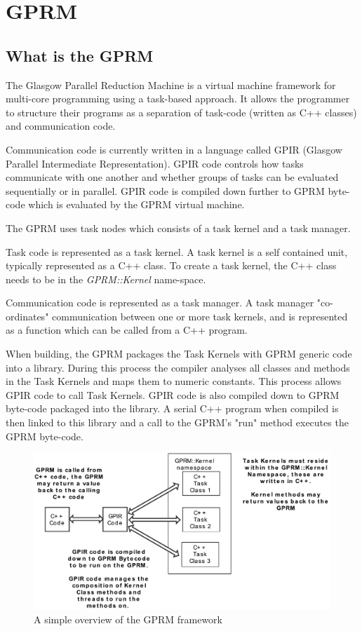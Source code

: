 \section{GPRM}

\subsection{What is the GPRM}

The Glasgow Parallel Reduction Machine\cite{GPRM} is a virtual machine framework for multi-core programming using a task-based approach. It allows the programmer to structure their programs as a separation of task-code (written as C++ classes) and communication code. 

Communication code is currently written in a language called GPIR (Glasgow Parallel Intermediate Representation). 
GPIR code controls how tasks communicate with one another and whether groups
of tasks can be evaluated sequentially or in parallel.  GPIR code is compiled down further to GPRM byte-code which is evaluated by the GPRM virtual machine.

The GPRM uses task nodes which consists of a task kernel and a task manager.

Task code is represented as a task kernel. A task kernel is a self contained unit, typically represented as a C++ class.
To create a task kernel, the C++ class needs to be in the \textit{GPRM::Kernel} name-space.

Communication code is represented as a task manager. A task manager "co-ordinates" communication between one or more task kernels, and
is represented as a function which can be called from a C++ program.


When building, the GPRM packages the Task Kernels with 
GPRM generic code into a library. During this process the compiler analyses all classes and methods in the
Task Kernels and maps them to numeric constants. This process allows GPIR code to call Task Kernels.
GPIR code is also compiled down to GPRM byte-code packaged into the library. A serial C++ program when compiled is then linked to
this library and a call to the GPRM's "run" method executes the GPRM byte-code. 

\newpage

\begin{figure}[ht]
\begin{center}
\includegraphics[scale=0.7]{graphs/gprm.pdf}
\caption{A simple overview of the GPRM framework}
\end{center}
\end{figure}

